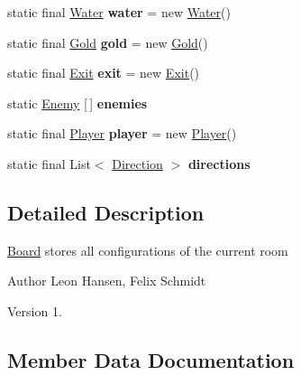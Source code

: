 \begin{DoxyCompactItemize}
static final \hyperlink{classasciicrawler_1_1Water}{Water} {\bfseries water} = new \hyperlink{classasciicrawler_1_1Water}{Water}()
\item 
\mbox{\label{classasciicrawler_1_1Board_af821e453812eaf8572780a71dacd23ce}} 
static final \hyperlink{classasciicrawler_1_1Gold}{Gold} {\bfseries gold} = new \hyperlink{classasciicrawler_1_1Gold}{Gold}()
\item 
\mbox{\label{classasciicrawler_1_1Board_a1b5144ca3bd142ab5545a67fa4cd2612}} 
static final \hyperlink{classasciicrawler_1_1Exit}{Exit} {\bfseries exit} = new \hyperlink{classasciicrawler_1_1Exit}{Exit}()
\item 
\mbox{\label{classasciicrawler_1_1Board_aa15d853590a296fa341b734b21e79b43}} 
static \hyperlink{classasciicrawler_1_1Enemy}{Enemy} \mbox{[}$\,$\mbox{]} {\bfseries enemies}
\item 
\mbox{\label{classasciicrawler_1_1Board_ab6a0f4e30f00268e4b33473efedb1c83}} 
static final \hyperlink{classasciicrawler_1_1Player}{Player} {\bfseries player} = new \hyperlink{classasciicrawler_1_1Player}{Player}()
\item 
static final List$<$ \hyperlink{enumasciicrawler_1_1Direction}{Direction} $>$ {\bfseries directions}
\end{DoxyCompactItemize}


\subsection{Detailed Description}
\hyperlink{classasciicrawler_1_1Board}{Board} stores all configurations of the current room

\begin{DoxyAuthor}{Author}
Leon Hansen, Felix Schmidt 
\end{DoxyAuthor}
\begin{DoxyVersion}{Version}
1. 
\end{DoxyVersion}


\subsection{Member Data Documentation}
\mbox{\label{classasciicrawler_1_1Board_a26b7ed317b5b9b2c8dd122a1cb369841}} 
